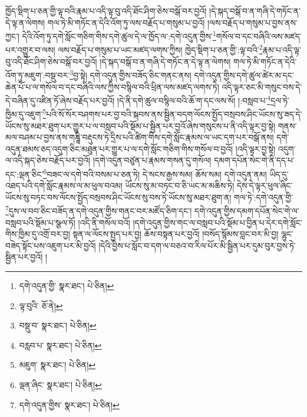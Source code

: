 ཁྱོད་སྡིག་པ་ཅན་གྱི་ལྟ་བའི་རྣམ་པ་འདི་ལྟ་བུ་འདི་ཐོང་ཤིག་ཅེས་བསྒོ་བར་བྱའོ། །དེ་སྐད་བསྒོ་བ་ན་གཞི་དེ་གཏོང་ན་དེ་ལྟ་ན་ལེགས། གལ་ཏེ་མི་གཏོང་ན་དེའི་འོག་ཏུ་ལས་བརྗོད་པ་གསུམ་པ་བྱའོ། །ལས་བརྗོད་པ་གསུམ་པ་བྱས་ནས་ཀྱང་། དེའི་འོག་ཏུ་དགེ་སློང་གཅིག་གིས་དགེ་ཚུལ་དེ་ལ་ཁྱོད་ལ་:དགེ་འདུན་གྱིས་\footnote{དགེ་འདུན་གྱི་  སྣར་ཐང་།  པེ་ཅིན། }གསོལ་བ་དང་བཞིའི་ལས་མཛད་པར་འགྱུར་བ་ལས། ལས་བརྗོད་པ་གསུམ་པ་ཡང་མཛད་ལགས་ཀྱིས། ཁྱེད་སྡིག་པ་ཅན་གྱི་:ལྟ་བའི་\footnote{ལྟ་བུའི་  ཅོ་ནེ། }རྣམ་པ་འདི་ལྟ་བུ་འདི་ཐོང་ཤིག་ཅེས་བསྒོ་བར་བྱའོ། །དེ་སྐད་བསྒོ་བ་ན་གཞི་དེ་གཏོང་ན་དེ་ལྟ་ན་ལེགས། གལ་ཏེ་མི་གཏོང་ན་དེའི་འོག་ཏུ་མཇུག་:བསྡུ་བར་\footnote{བསྡུ་བ་  སྣར་ཐང་།  པེ་ཅིན། }བྱ་སྟེ། དགེ་འདུན་གྱིས་བཟོད་ཅིང་གནང་ནས། དགེ་འདུན་གྱིས་དགེ་ཚུལ་ཚེར་མ་དང་ཆེན་པོ་པ་ལ་གསོལ་བ་དང་བཞིའི་ལས་ཀྱིས་བསྙིལ་བའི་ཕྲིན་ལས་མཛད་ལགས་ཏེ། འདི་ལྟར་ཅང་མི་གསུང་བས་དེ་དེ་བཞིན་དུ་འཛིན་ཏོ་ཞེས་བརྗོད་པར་བྱའོ། །དེ་ནི་དགེ་ཚུལ་བསྙིལ་བའི་ཆོ་ག་དང་ལས་སོ། །:བསླབ་པ་\footnote{བརླབ་པ་  སྣར་ཐང་།  པེ་ཅིན། }དྲལ་ཏེ་ཁྱིམ་དུ་འཇུག་\footnote{མཇུག་  སྣར་ཐང་།  པེ་ཅིན། }པའི་སོ་སོར་བཤགས་པར་བྱ་བའི་སྐབས་ནས་སྦྱིན་བདག་ལོངས་སྤྱོད་བསྲབས་ཤིང་ཡོངས་སུ་ཟད་དེ་ཡོངས་སུ་མཐར་ཐུག་པར་གྱུར་པ་ལ་བསླབ་པའི་སྡོམ་པ་སྦྱིན་པར་བྱའོ་ཞེས་གསུངས་པ་ནི་འདི་ལྟར་བྱ་སྟེ། གནས་མལ་བཤམ་པ་བྱས་ནས་གཎྜཱི་བརྡུངས་ཏེ་དྲིས་པའི་ཚིག་གིས་དགེ་སློང་རྣམས་ལ་ཡང་དག་པར་བསྒོ་ནས། དགེ་འདུན་ཐམས་ཅད་འདུག་ཅིང་མཐུན་པར་གྱུར་པ་ལ་དགེ་སློང་གཅིག་གིས་གསོལ་བ་བྱའོ། །འདི་ལྟར་བྱ་སྟེ། འདུག་ལ་འདི་སྐད་ཅེས་བརྗོད་པར་བྱའོ། །དགེ་འདུན་བཙུན་པ་རྣམས་གསན་དུ་གསོལ། དམག་དཔོན་སེང་གེ་ནི་དད་པ་དང་:ལྡན་ཅིང་\footnote{ལྡན་ཞིང་  སྣར་ཐང་།  པེ་ཅིན། }བཟང་ལ་དགེ་བའི་བསམ་པ་ཅན་ཏེ། དེ་སངས་རྒྱས་སམ། ཆོས་སམ། དགེ་འདུན་ནམ། ཡིད་དུ་འཐད་པའི་དགེ་སློང་རྣམས་ལ་མ་ཕུལ་བའམ། ཡོངས་སུ་མ་བཏང་བ་ཅི་ཡང་མ་མཆིས་ཏེ། དེས་དེ་ལྟར་ཕུལ་ཞིང་ཡོངས་སུ་བཏང་བས་ལོངས་སྤྱོད་བསྲབས་ཤིང་ཡོངས་སུ་བས་ཏེ་ཡོངས་སུ་མཐར་ཐུག་ན། གལ་ཏེ་:དགེ་འདུན་གྱི་\footnote{དགེ་འདུན་གྱིས་  སྣར་ཐང་།  པེ་ཅིན། }དུས་ལ་བབ་ཅིང་བཟོད་ན་དགེ་འདུན་གྱིས་གནང་བར་མཛོད་ཅིག་དང་། དགེ་འདུན་གྱིས་དམག་དཔོན་སེང་གེ་ལ་བསླབ་པའི་སྡོམ་པ་སྩལ་ཏོ། །འདི་ནི་གསོལ་བའོ། །དགེ་འདུན་གྱིས་གང་ལ་བསླབ་པའི་སྡོམ་པ་བྱིན་པ་དེར་དགེ་སློང་གིས་ཁྱིམ་དུ་འགྲོ་བར་བྱ། སྟན་ལ་ལོངས་སྤྱད་པར་བྱ། ཆོས་བསྟན་པར་བྱའོ། །བསོད་སྙོམས་བླང་བར་མི་བྱ། ལྷུང་བཟེད་སྟོང་པས་འཇུག་པར་མི་བྱའོ། །དེའི་བྱིས་པ་སློང་བ་དག་ལ་བཅའ་བ་རིལ་པོར་མི་སྦྱིན་པར་དུམ་བུར་བྱས་ཏེ་སྦྱིན་པར་བྱའོ། །
